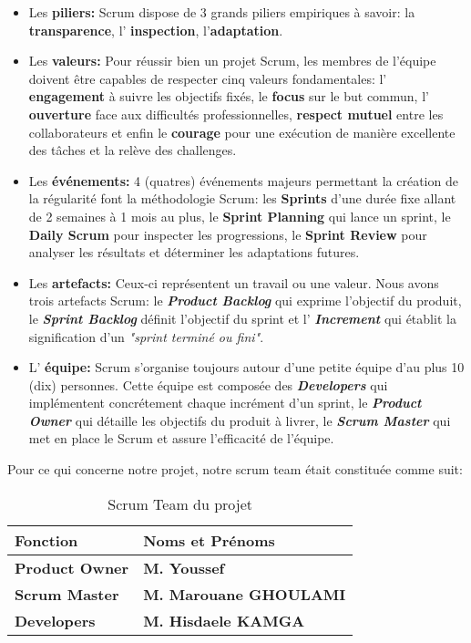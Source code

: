         \begin{itemize}
            \item Les \textbf{piliers: } Scrum dispose de 3 grands piliers empiriques à savoir: la \textbf{transparence}, l' \textbf{inspection},  l'\textbf{adaptation}.
            \item Les \textbf{valeurs: }Pour réussir bien un projet Scrum, les membres de l'équipe doivent être capables de respecter cinq valeurs fondamentales: l' \textbf{engagement} à suivre les objectifs fixés, le \textbf{focus} sur le but commun, l' \textbf{ouverture} face aux difficultés professionnelles,  \textbf{respect mutuel} entre les collaborateurs et enfin le \textbf{courage} pour une exécution de manière excellente des tâches et la relève des challenges.
            \item Les \textbf{événements: } 4 (quatres) événements majeurs permettant la création de la régularité font la méthodologie Scrum: les \textbf{Sprints} d'une durée fixe allant de 2 semaines à 1 mois au plus, le \textbf{Sprint Planning} qui lance un sprint, le \textbf{Daily Scrum} pour inspecter les progressions, le \textbf{Sprint Review} pour analyser les résultats et déterminer les adaptations futures.
            \item Les \textbf{artefacts: }Ceux-ci représentent un travail ou une valeur. Nous avons trois artefacts Scrum: le \textbf{\textit{Product Backlog}} qui exprime l'objectif du produit, le \textbf{\textit{Sprint Backlog}} définit l'objectif du sprint et l' \textbf{\textit{Increment}} qui établit la signification d'un \textit{"sprint terminé ou fini"}.
            
            \item L' \textbf{équipe: }Scrum s'organise toujours autour d'une petite équipe d'au plus 10 (dix) personnes. Cette équipe est composée des \textbf{\textit{Developers}} qui implémentent concrétement chaque incrément d'un sprint, le \textbf{\textit{Product Owner}} qui détaille les objectifs du produit à livrer, le \textbf{\textit{Scrum Master}} qui met en place le Scrum et assure l'efficacité de l'équipe.
        \end{itemize}
    Pour ce qui concerne notre projet, notre scrum team était constituée comme suit:
        \begin{table}[H]
            \centering
            \begin{tabular}{|l|l|}
                \hline
                \rowcolor{Gray}
                \textbf{Fonction} & \textbf{Noms et Prénoms} \\ \hline
                \textbf{Product Owner} & \textbf{M. Youssef} \\ \hline
                \textbf{Scrum Master} & \textbf{M. Marouane GHOULAMI} \\ \hline
                \textbf{Developers} & \textbf{M. Hisdaele KAMGA} \\ \hline  
            \end{tabular}
            \caption{Scrum Team du projet}
        \end{table}
